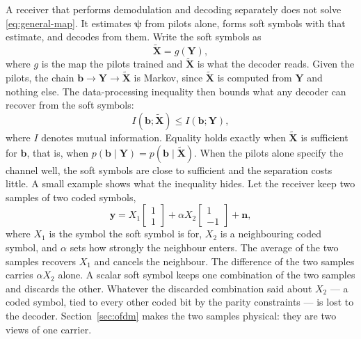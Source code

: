 \documentclass[conference]{IEEEtran}
\begin{document}
A receiver that performs demodulation and decoding separately does not
solve \eqref{eq:general-map}.  It estimates \(\bm\psi\) from pilots alone,
forms soft symbols with that estimate, and decodes from them.  Write the
soft symbols as
\begin{equation}
  \widetilde{\mathbf X}=g(\mathbf Y),
  \label{eq:soft-symbol-statistic}
\end{equation}
where \(g\) is the map the pilots trained and \(\widetilde{\mathbf X}\) is
what the decoder reads.  Given the pilots, the chain
\(\mathbf b\rightarrow\mathbf Y\rightarrow\widetilde{\mathbf X}\) is Markov,
since \(\widetilde{\mathbf X}\) is computed from \(\mathbf Y\) and nothing
else.  The data-processing inequality then bounds what any decoder can
recover from the soft symbols:
\begin{equation}
  I(\mathbf b;\widetilde{\mathbf X})
  \le
  I(\mathbf b;\mathbf Y),
  \label{eq:dpi}
\end{equation}
where \(I\) denotes mutual information.  Equality holds exactly when
\(\widetilde{\mathbf X}\) is sufficient for \(\mathbf b\), that is, when
\(p(\mathbf b\mid\mathbf Y)=p(\mathbf b\mid\widetilde{\mathbf X})\).  When
the pilots alone specify the channel well, the soft symbols are close to
sufficient and the separation costs little.  A small example shows what the inequality hides.  Let the receiver keep
two samples of two coded symbols,
\begin{equation}
  \mathbf y
  =
  X_1\begin{bmatrix}1\\1\end{bmatrix}
  +\alpha X_2\begin{bmatrix}1\\-1\end{bmatrix}
  +\mathbf n,
  \label{eq:two-sample-example}
\end{equation}
where \(X_1\) is the symbol the soft symbol is for, \(X_2\) is a
neighbouring coded symbol, and \(\alpha\) sets how strongly the neighbour
enters.  The average of the two samples recovers \(X_1\) and cancels the
neighbour.  The difference of the two samples carries \(\alpha X_2\)
alone.  A scalar soft symbol keeps one combination of the two samples and
discards the other.  Whatever the discarded combination said about
\(X_2\) --- a coded symbol, tied to every other coded bit by the parity
constraints --- is lost to the decoder.  Section~\ref{sec:ofdm} makes the
two samples physical: they are two views of one carrier.
\end{document}
